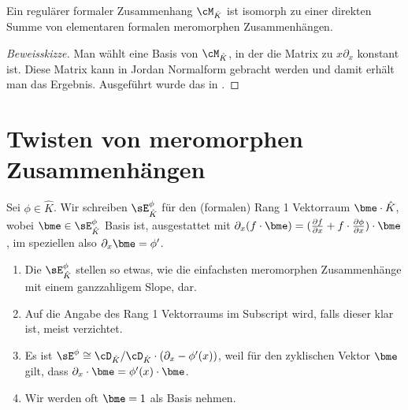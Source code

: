 \begin{thm} \label{thm:regulärInDirSumme}
Ein regulärer formaler Zusammenhang $\cM_{\hat K}$ ist isomorph zu einer
direkten Summe von elementaren formalen meromorphen Zusammenhängen.
\end{thm}
\begin{proof}[Beweisskizze]
Man wählt eine Basis von $\cM_{\hat K}$, in der die Matrix zu $x\partial_x$
konstant ist. Diese Matrix kann in Jordan Normalform gebracht werden und damit
erhält man das Ergebnis.
Ausgeführt wurde das in \cite[Cor. 5.2.6]{sabbah_cimpa90}.
\end{proof}

\section{Twisten von meromorphen Zusammenhängen}
\begin{comment}
ALT:
\begin{defn}
\cite[1.a]{sabbah_Fourier-local}
Sei $\phi\in\hat K$.
Wir schreiben $\sE_{\hat K}^\phi$ für den (formalen) Rang 1 Vektorraum $\Cfxl
\bydef \hat K$ ausgestattet mit dem Zusammenhang
$\nabla=\partial_x+\partial_x\phi$, im speziellen also
$\nabla_{\partial_x}1=\partial_x1=\phi'$.\\
\end{defn}
\end{comment}
\begin{defn} \label{defn:rang1Vr}
\cite[1.a]{sabbah_Fourier-local}
Sei $\phi\in\hat K$.
Wir schreiben $\sE_{\hat K}^\phi$ für den (formalen) Rang 1 Vektorraum 
$\bme\cdot\hat K$, wobei $\bme\in\sE_{\hat K}^\phi$ Basis ist, ausgestattet mit
$\partial_x(f\cdot \bme)
=(\frac{\partial f}{\partial x}+f\cdot\frac{\partial\phi}{\partial
x})\cdot\bme$, 
im speziellen also $\partial_x\bme=\phi'$.
\end{defn}
\begin{bem}
\begin{enumerate}
\item Die $\sE_{\hat K}^\phi$ stellen so etwas, wie die einfachsten meromorphen
Zusammenhänge mit einem ganzzahligem Slope, dar.
\item Auf die Angabe des Rang 1 Vektorraums im Subscript wird, falls dieser
klar ist, meist verzichtet.
\item Es ist $\sE^\phi\cong\cD_{\hat K}/\cD_{\hat
K}\cdot(\partial_x-\phi'(x))$, weil für den zyklischen Vektor $\bme$ gilt, dass
$\partial_x \cdot \bme = \phi'(x) \cdot \bme$.
\item Wir werden oft $\bme=1$ als Basis nehmen.
\end{enumerate}
\end{bem}

